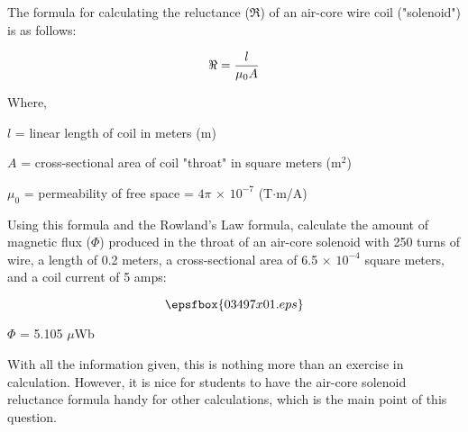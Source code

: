 

The formula for calculating the reluctance ($\Re$) of an air-core wire coil ("solenoid") is as follows:

$$\Re = {l \over {\mu_0 A}}$$

\noindent
Where,

$l$ = linear length of coil in meters (m)

$A$ = cross-sectional area of coil "throat" in square meters (m$^{2}$)

$\mu_0$ = permeability of free space = $4 \pi$ $\times$ $10^{-7}$ (T$\cdot$m/A)

\vskip 10pt

Using this formula and the Rowland's Law formula, calculate the amount of magnetic flux ($\Phi$) produced in the throat of an air-core solenoid with 250 turns of wire, a length of 0.2 meters, a cross-sectional area of 6.5 $\times$ $10^{-4}$ square meters, and a coil current of 5 amps:

$$\epsfbox{03497x01.eps}$$







$\Phi$ = 5.105 $\mu$Wb







With all the information given, this is nothing more than an exercise in calculation.  However, it is nice for students to have the air-core solenoid reluctance formula handy for other calculations, which is the main point of this question.





